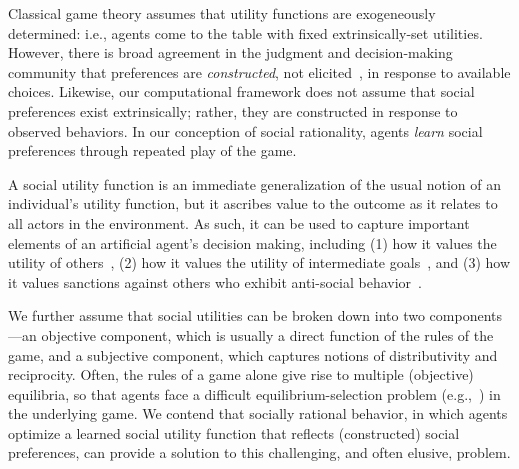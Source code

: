 Classical game theory assumes that utility functions are exogeneously
determined: i.e., agents come to the table with fixed
extrinsically-set utilities.
However, there is broad agreement in the judgment and decision-making
community that preferences are \emph{constructed}, not
elicited~\cite{Payne_Bettman_Johnson_1993}, in response to available
choices.  Likewise, our computational framework does not assume that
social preferences exist extrinsically; rather, they are constructed
in response to observed behaviors.  In our conception of social
rationality, agents \emph{learn\/} social preferences through repeated
play of the game.

A social utility function is an immediate generalization of the usual
notion of an individual's utility function, but it ascribes value to
the outcome as it relates to all actors in the environment.
%
%
As such, it can be used to capture important elements of an artificial
agent's decision making, including (1) how it values the utility of
others~\cite{littman01d}, (2) how it values the utility of intermediate goals~\cite{macglashan15b}, and (3)
how it values sanctions against others who exhibit anti-social behavior~\cite{macglashan14c}.

We further assume that social utilities can be broken down into two
components---an objective component, which is usually a direct
function of the rules of the game, and a subjective component, which
captures notions of distributivity and reciprocity.
%
Often, the rules of a game alone give rise to multiple (objective)
equilibria, so that agents face a difficult equilibrium-selection
problem (e.g.,~\cite{schelling1980strategy}) in the underlying game.
%
We contend that socially rational behavior, in which agents optimize a
learned social utility function that reflects (constructed) social
preferences, can provide a solution to this challenging, and often
elusive, problem.



